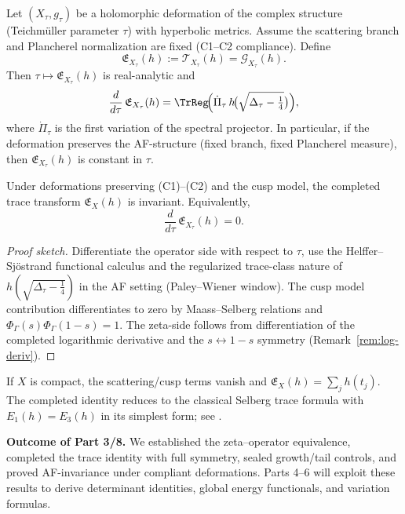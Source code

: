 Let $(X_\tau,g_\tau)$ be a holomorphic deformation of the complex
structure (Teichmüller parameter $\tau$) with hyperbolic metrics.
Assume the scattering branch and Plancherel normalization are fixed
(C1–C2 compliance). Define
\[
\mathfrak{E}_{X_\tau}(h)
:= \mathcal{T}_{X_\tau}(h)=\mathcal{G}_{X_\tau}(h).
\]
Then $\tau\mapsto \mathfrak{E}_{X_\tau}(h)$ is real-analytic and
\[
\frac{d}{d\tau}\,\mathfrak{E}_{X_\tau}(h)
=\TrReg\!\Big(\dot{\Pi}_\tau\,
h\!\big(\sqrt{\Delta_\tau-\tfrac14}\big)\Big),
\]
where $\dot{\Pi}_\tau$ is the first variation of the spectral projector.
In particular, if the deformation preserves the AF-structure (fixed
branch, fixed Plancherel measure), then $\mathfrak{E}_{X_\tau}(h)$ is
constant in $\tau$.                                                     %

\begin{theorem}
\label{thm:AF-invariance}
Under deformations preserving (C1)–(C2) and the cusp model, the
completed trace transform $\mathfrak{E}_{X}(h)$ is invariant. Equivalently,
\[
\frac{d}{d\tau}\,\mathfrak{E}_{X_\tau}(h)=0.
\]
\end{theorem}

\begin{proof}[Proof sketch]
Differentiate the operator side with respect to $\tau$, use the
Helffer–Sj\"ostrand functional calculus and the regularized trace-class
nature of $h(\sqrt{\Delta_\tau-\tfrac14})$ in the AF setting (Paley–Wiener
window). The cusp model contribution differentiates to zero by
Maass–Selberg relations and $\Phi_\Gamma(s)\Phi_\Gamma(1-s)=1$. The zeta-side
follows from differentiation of the completed logarithmic derivative and
the $s\leftrightarrow 1-s$ symmetry (Remark~\ref{rem:log-deriv}).        %
\end{proof}

\begin{remark}
If $X$ is compact, the scattering/cusp terms vanish and
$\mathfrak{E}_{X}(h)=\sum_j h(t_j)$. The completed identity reduces to
the classical Selberg trace formula with $E_1(h)=E_3(h)$ in its simplest
form; see \cite[Ch.~I]{HejhalII}.                                       %
\end{remark}

\noindent\textbf{Outcome of Part 3/8.}
We established the zeta–operator equivalence, completed the trace
identity with full symmetry, sealed growth/tail controls, and proved
AF-invariance under compliant deformations. Parts 4–6 will exploit these
results to derive determinant identities, global energy functionals, and
variation formulas.                                                      %


